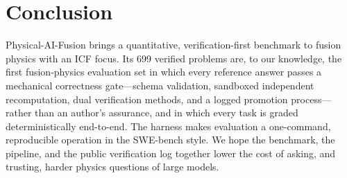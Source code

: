 \section{Conclusion}
\label{sec:conclusion}

Physical-AI-Fusion brings a quantitative, verification-first benchmark to fusion physics with an ICF focus. Its 699 verified problems are, to our knowledge, the first fusion-physics evaluation set in which every reference answer passes a mechanical correctness gate---schema validation, sandboxed independent recomputation, dual verification methods, and a logged promotion process---rather than an author's assurance, and in which every task is graded deterministically end-to-end. The harness makes evaluation a one-command, reproducible operation in the SWE-bench style. We hope the benchmark, the pipeline, and the public verification log together lower the cost of asking, and trusting, harder physics questions of large models.
